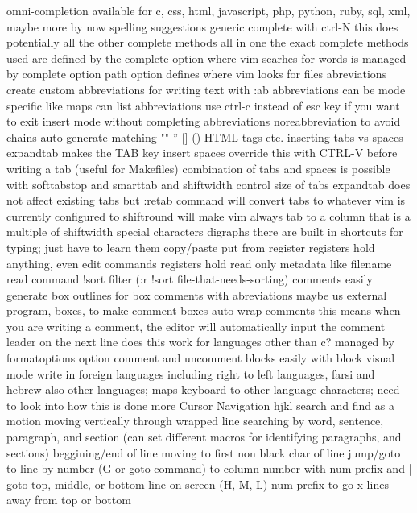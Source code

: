 \documentclass[12pt]{book}
\begin{document}
    omni-completion
      available for c, css, html, javascript, php, python, ruby, sql, xml, maybe more by now
    spelling suggestions
    generic complete with ctrl-N
      this does potentially all the other complete methods all in one
      the exact complete methods used are defined by the complete option
    where vim searhes for words is managed by complete option
    path option defines where vim looks for files
    abreviations
      create custom abbreviations for writing text with :ab
      abbreviations can be mode specific like maps
      can list abbreviations
      use ctrl-c instead of esc key if you want to exit insert mode without completing abbreviations
      noreabbreviation to avoid chains
    auto generate matching "" '' [] {} () HTML-tags etc.
  inserting tabs vs spaces
    expandtab makes the TAB key insert spaces
    override this with CTRL-V before writing a tab (useful for Makefiles)
    combination of tabs and spaces is possible with softtabstop and smarttab and shiftwidth
		control size of tabs
		expandtab does not affect existing tabs but :retab command will convert tabs to whatever vim is currently configured to
		shiftround will make vim always tab to a column that is a multiple of shiftwidth
  special characters
    digraphs
      there are built in shortcuts for typing; just have to learn them
  copy/paste
    put from register
      registers hold anything, even edit commands
      registers hold read only metadata like filename
    read command
      !sort filter (:r !sort file-that-needs-sorting)
  comments
    easily generate box outlines for box comments with abreviations
    maybe us external program, boxes, to make comment boxes
    auto wrap comments
      this means when you are writing a comment, the editor will automatically input the comment leader on the next line
      does this work for languages other than c?
      managed by formatoptions option
    comment and uncomment blocks easily with block visual mode
  write in foreign languages including right to left languages, farsi and hebrew
    also other languages; maps keyboard to other language characters; need to look into how this is done more
Cursor Navigation
  hjkl
  search and find as a motion
  moving vertically through wrapped line
  searching
  by word, sentence, paragraph, and section (can set different macros for identifying paragraphs, and sections)
  beggining/end of line
  moving to first non black char of line
  jump/goto
    to line by number (G or goto command)
    to column number with num prefix and |
    goto top, middle, or bottom line on screen (H, M, L) num prefix to go x lines away from top or bottom
\end{document}
